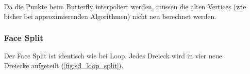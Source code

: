 Da die Punkte beim Butterfly interpoliert werden, müssen die alten Vertices
(wie bisher bei approximierenden Algorithmen) nicht neu berechnet werden. 

\subsubsection*{Face Split}
Der Face Split ist identisch wie bei Loop.
Jedes Dreieck wird in vier neue Dreiecke aufgeteilt (\autoref{fig:sd_loop_split}).
\cite[S. 64ff]{Standford.24.07.2015} \cite[S. 72ff]{Zorin.subdivcourse}
\cite{Seeger01asub-atomic}
\cite{Gamasutra}
\cite{Sharp}
\cite{Zorin:1996:ISM:237170.237254}